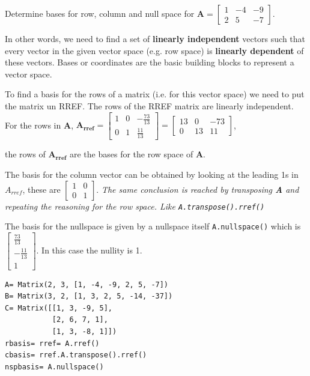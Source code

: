 Determine bases for row, column and null space for
$\mathbf{A} = \left[\begin{matrix}1 & -4 & -9\\2 & 5 & -7\end{matrix}\right]$.

In other words, we need to find a set of \textbf{linearly independent} vectors such that
every vector in the given vector space (e.g. row space) is \textbf{linearly dependent} of these
vectors. Bases or coordinates are the basic building blocks to represent a vector
space.

To find a basis for the rows of a matrix (i.e. for this vector space) we need to
put the matrix un RREF. The rows of the RREF matrix are linearly independent. For
the rows in \textbf{A},
$\mathbf{A_{rref}} =
\left[\begin{matrix}1 & 0 & - \frac{73}{13}\\0 & 1 & \frac{11}{13}\end{matrix}\right] =
\left[\begin{matrix}13 & 0 & -73\\0 & 13 & 11\end{matrix}\right]$,

the rows of $\mathbf{A_{rref}}$ are the bases for the row space of $\mathbf{A}$.

The basis for the column vector can be obtained by looking at the leading 1s in
$A_{rref}$, these are $\left[\begin{matrix}1 & 0\\0 & 1\end{matrix}\right]$. \emph{
The same conclusion is reached by transposing \textbf{A} and repeating the reasoning
for the row space. Like \texttt{A.transpose().rref()}}

The basis for the nullspace is given by a nullspace itself \texttt{A.nullspace()}
which is $\left[\begin{matrix}\frac{73}{13}\\- \frac{11}{13}\\1\end{matrix}\right]$.
In this case the nullity is 1.

\begin{verbatim}
A= Matrix(2, 3, [1, -4, -9, 2, 5, -7])
B= Matrix(3, 2, [1, 3, 2, 5, -14, -37])
C= Matrix([[1, 3, -9, 5],
           [2, 6, 7, 1],
           [1, 3, -8, 1]])
rbasis= rref= A.rref()
cbasis= rref.A.transpose().rref()
nspbasis= A.nullspace()
\end{verbatim}

